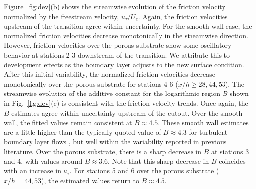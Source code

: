 \documentclass[letterpaper,11pt]{article}
\begin{document}
Figure~\ref{fig:dev}(b) shows the streamwise evolution of the friction velocity normalized by the freestream velocity, $u_\tau/U_e$.  Again, the friction velocities upstream of the transition agree within uncertainty.  For the smooth wall case, the normalized friction velocities decrease monotonically in the streamwise direction.  However, friction velocities over the porous substrate show some oscillatory behavior at stations 2-3 downstream of the transition.  We attribute this to development effects as the boundary layer adjusts to the new surface condition.  After this initial variability, the normalized friction velocities decrease monotonically over the porous substrate for stations 4-6 ($x/h \ge 28, 44, 53$).  The streamwise evolution of the additive constant for the logarithmic region $B$ shown in Fig.~\ref{fig:dev}(c) is consistent with the friction velocity trends.  Once again, the $B$ estimates agree within uncertainty upstream of the cutout.  Over the smooth wall, the fitted values remain consistent at $B \approx 4.5$.  These smooth wall estimates are a little higher than the typically quoted value of $B \approx 4.3$ for turbulent boundary layer flows \citep{marusic2013logarithmic}, but well within the variability reported in previous literature.  Over the porous substrate, there is a sharp decrease in $B$ at stations 3 and 4, with values around $B \approx 3.6$.  Note that this sharp decrease in $B$ coincides with an increase in $u_\tau$.  For stations 5 and 6 over the porous substrate ($x/h = 44, 53$), the estimated values return to $B \approx 4.5$.  
\end{document}

